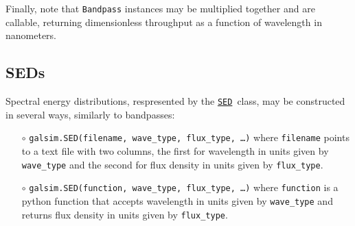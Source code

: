 \documentclass[preprint,10pt]{../../devel/modules/aastex}
\newcommand\SED{\href{http://galsim-developers.github.io/GalSim/classgalsim_1_1sed_1_1_s_e_d.html}{\texttt{SED}}}
\begin{document}
Finally, note that \texttt{Bandpass} instances may be multiplied
together and are callable, returning dimensionless throughput as a
function of wavelength in nanometers.

\subsection{SEDs}
Spectral energy distributions, respresented by the \SED\ class,
may be constructed in several ways, similarly to bandpasses:
\begin{itemize}
  \item[$\circ$]
  \texttt{galsim.SED(filename, wave\_type, flux\_type, \dots)}
    \newline
    where \texttt{filename} points to a
    text file with two columns, the first for wavelength in units given by \texttt{wave\_type} and the second for flux
    density in units given by \texttt{flux\_type}.
  \item[$\circ$]
  \texttt{galsim.SED(function, wave\_type, flux\_type, \dots)}
    \newline
    where \texttt{function} is a python
    function that accepts wavelength in units given by \texttt{wave\_type} and returns flux density in units given by \texttt{flux\_type}.
\end{itemize}
\end{document}
